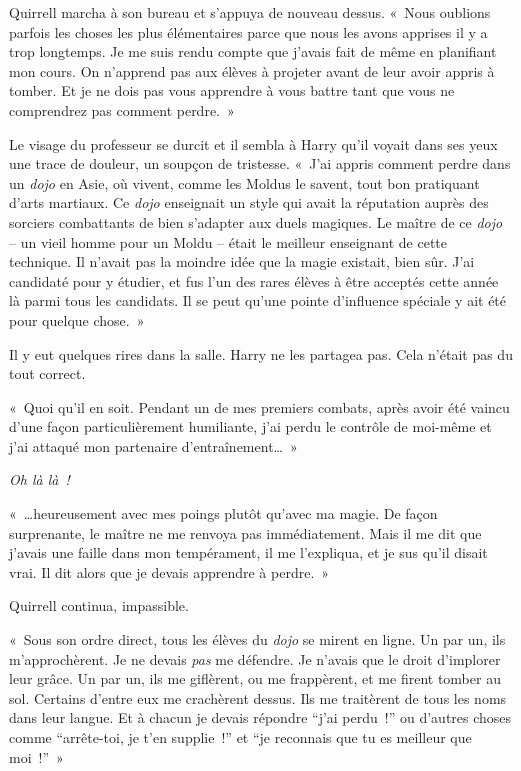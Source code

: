 Quirrell marcha à son bureau et s'appuya de nouveau dessus.
«~Nous oublions parfois les choses les plus élémentaires parce que nous les avons apprises il y a trop longtemps.
Je me suis rendu compte que j'avais fait de même en planifiant mon cours.
On n'apprend pas aux élèves à projeter avant de leur avoir appris à tomber.
Et je ne dois pas vous apprendre à vous battre tant que vous ne comprendrez pas comment perdre.~»

Le visage du professeur se durcit et il sembla à Harry qu'il voyait dans ses yeux une trace de douleur, un soupçon de tristesse.
«~J'ai appris comment perdre dans un \emph{dojo} en Asie, où vivent, comme les Moldus le savent, tout bon pratiquant d'arts martiaux.
Ce \emph{dojo} enseignait un style qui avait la réputation auprès des sorciers combattants de bien s'adapter aux duels magiques.
Le maître de ce \emph{dojo} -- un vieil homme pour un Moldu -- était le meilleur enseignant de cette technique.
Il n'avait pas la moindre idée que la magie existait, bien sûr.
J'ai candidaté pour y étudier, et fus l'un des rares élèves à être acceptés cette année là parmi tous les candidats.
Il se peut qu'une pointe d'influence spéciale y ait été pour quelque chose.~»

Il y eut quelques rires dans la salle.
Harry ne les partagea pas.
Cela n'était pas du tout correct.

«~Quoi qu'il en soit.
Pendant un de mes premiers combats, après avoir été vaincu d'une façon particulièrement humiliante, j'ai perdu le contrôle de moi-même et j'ai attaqué mon partenaire d'entraînement…~»

\emph{Oh là là~!}

«~…heureusement avec mes poings plutôt qu'avec ma magie.
De façon surprenante, le maître ne me renvoya pas immédiatement.
Mais il me dit que j'avais une faille dans mon tempérament, il me l'expliqua, et je sus qu'il disait vrai.
Il dit alors que je devais apprendre à perdre.~»

Quirrell continua, impassible.

«~Sous son ordre direct, tous les élèves du \emph{dojo} se mirent en ligne.
Un par un, ils m'approchèrent.
Je ne devais \emph{pas} me défendre.
Je n'avais que le droit d'implorer leur grâce.
Un par un, ils me giflèrent, ou me frappèrent, et me firent tomber au sol.
Certains d'entre eux me crachèrent dessus.
Ils me traitèrent de tous les noms dans leur langue.
Et à chacun je devais répondre “j'ai perdu~!” ou d'autres choses comme “arrête-toi, je t'en supplie~!” et “je reconnais que tu es meilleur que moi~!”~»

